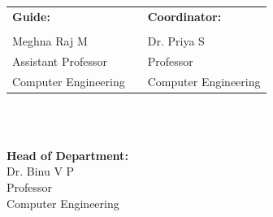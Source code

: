 \documentclass[11pt]{report}
\begin{document}
\begin{titlepage}
\begin{tabular}{p{}p{}p{}}
\textbf{Guide:} & & \textbf{Coordinator:} \\[0.6cm]
& & \\
 Meghna Raj M & & Dr. Priya S \\
Assistant Professor & &Professor \\
Computer Engineering & & Computer Engineering \\
\end{tabular} 
\\ \\
\begin{center}
\textbf{Head of Department:} \\
\vspace{1.3cm}
Dr. Binu V P \\
Professor \\
Computer Engineering
\end{center}


\end{titlepage}
\end{document}
